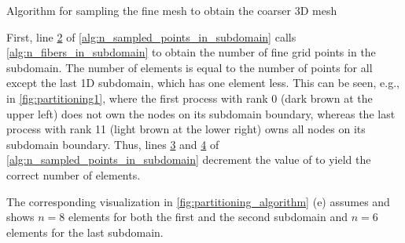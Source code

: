 \begin{algorithm}
  \caption{Algorithm for sampling the fine mesh to obtain the coarser 3D mesh}%
  \label{alg:n_sampled_points_in_subdomain}%
\end{algorithm}%

First, line \hyperlink{alg:4.2}{2} of \cref{alg:n_sampled_points_in_subdomain} calls \cref{alg:n_fibers_in_subdomain} to obtain the number of fine grid points in the subdomain. The number of elements  is equal to the number of points for all except the last 1D subdomain, which has one element less. This can be seen, e.g., in \cref{fig:partitioning1}, where the first process with rank 0 (dark brown at the upper left) does not own the nodes on its subdomain boundary, whereas the last process with rank 11 (light brown at the lower right) owns all nodes on its subdomain boundary.
Thus, lines \hyperlink{alg:4.3}{3} and \hyperlink{alg:4.4}{4} of \cref{alg:n_sampled_points_in_subdomain} decrement the value of  to yield the correct number of elements. 

The corresponding visualization in \cref{fig:partitioning_algorithm} (e) assumes  and shows $n=8$ elements for both the first and the second subdomain and $n=6$ elements for the last subdomain. 

